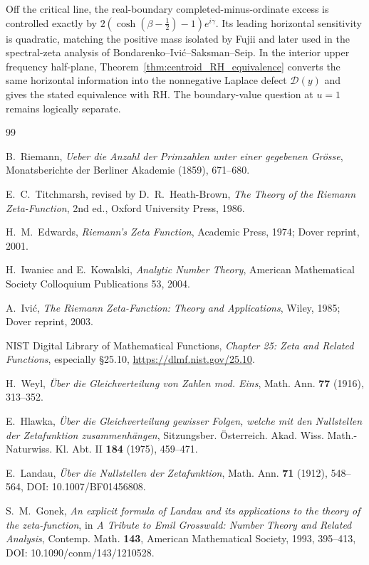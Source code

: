 \documentclass[11pt]{amsart}
\numberwithin{equation}{section}
\theoremstyle{definition}
\theoremstyle{remark}
\begin{document}
Off the critical line, the real-boundary completed-minus-ordinate excess is controlled exactly by $2(\cosh(\beta-\tfrac12)-1)e^{i\gamma}$. Its leading horizontal sensitivity is quadratic, matching the positive mass isolated by Fujii and later used in the spectral-zeta analysis of Bondarenko--Ivić--Saksman--Seip. In the interior upper frequency half-plane, Theorem~\ref{thm:centroid_RH_equivalence} converts the same horizontal information into the nonnegative Laplace defect $\mathcal D(y)$ and gives the stated equivalence with RH. The boundary-value question at $u=1$ remains logically separate.

\begin{thebibliography}{99}

B.~Riemann,
\emph{Ueber die Anzahl der Primzahlen unter einer gegebenen Grösse},
Monatsberichte der Berliner Akademie (1859), 671--680.

E.~C.~Titchmarsh, revised by D.~R.~Heath-Brown,
\emph{The Theory of the Riemann Zeta-Function}, 2nd ed.,
Oxford University Press, 1986.

H.~M.~Edwards,
\emph{Riemann's Zeta Function},
Academic Press, 1974; Dover reprint, 2001.

H.~Iwaniec and E.~Kowalski,
\emph{Analytic Number Theory},
American Mathematical Society Colloquium Publications 53, 2004.

A.~Ivić,
\emph{The Riemann Zeta-Function: Theory and Applications},
Wiley, 1985; Dover reprint, 2003.

NIST Digital Library of Mathematical Functions,
\emph{Chapter 25: Zeta and Related Functions}, especially \S25.10,
\url{https://dlmf.nist.gov/25.10}.

H.~Weyl,
\emph{Über die Gleichverteilung von Zahlen mod. Eins},
Math. Ann. \textbf{77} (1916), 313--352.

E.~Hlawka,
\emph{Über die Gleichverteilung gewisser Folgen, welche mit den Nullstellen der Zetafunktion zusammenhängen},
Sitzungsber. Österreich. Akad. Wiss. Math.-Naturwiss. Kl. Abt. II \textbf{184} (1975), 459--471.

E.~Landau,
\emph{Über die Nullstellen der Zetafunktion},
Math. Ann. \textbf{71} (1912), 548--564,
DOI: 10.1007/BF01456808.

S.~M.~Gonek,
\emph{An explicit formula of Landau and its applications to the theory of the zeta-function},
in \emph{A Tribute to Emil Grosswald: Number Theory and Related Analysis},
Contemp. Math. \textbf{143}, American Mathematical Society, 1993, 395--413,
DOI: 10.1090/conm/143/1210528.


\end{thebibliography}
\end{document}

